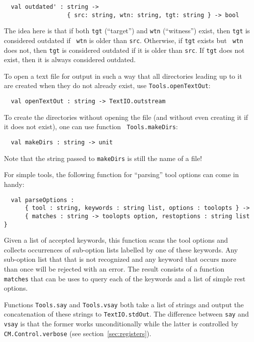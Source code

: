 \begin{verbatim}
  val outdated' : string ->
                  { src: string, wtn: string, tgt: string } -> bool
\end{verbatim}

The idea here is that if both {\tt tgt} (``target'') and {\tt wtn}
(``witness'') exist, then {\tt tgt} is considered outdated if {\tt
wtn} is older than {\tt src}.  Otherwise, if {\tt tgt} exists but {\tt
wtn} does not, then {\tt tgt} is considered outdated if it is older
than {\tt src}.  If {\tt tgt} does not exist, then it is always
considered outdated.

  To open a text file for
output in such a way that all directories leading up to it are created
when they do not already exist, use {\tt Tools.openTextOut}:

\begin{verbatim}
  val openTextOut : string -> TextIO.outstream
\end{verbatim}

To create the directories without opening the file (and without even
creating it if it does not exist), one can use function {\tt
Tools.makeDirs}:

\begin{verbatim}
  val makeDirs : string -> unit
\end{verbatim}

Note that the string passed to {\tt makeDirs} is still the name of a
file!

  For simple tools, the following
function for ``parsing'' tool options can come in handy:

\begin{verbatim}
  val parseOptions :
      { tool : string, keywords : string list, options : toolopts } ->
      { matches : string -> toolopts option, restoptions : string list }
\end{verbatim}

Given a list of accepted keywords, this function scans the tool
options and collects occurrences of sub-option lists labelled by one
of these keywords.  Any sub-option list that that is not recognized
and any keyword that occurs more than once will be rejected with an
error.  The result consists of a function {\tt matches} that can be
uses to query each of the keywords and a list of simple rest options.

  Functions {\tt Tools.say} and
{\tt Tools.vsay} both take a list of strings and output the
concatenation of these strings to {\tt TextIO.stdOut}.  The difference
between {\tt say} and {\tt vsay} is that the former works
unconditionally while the latter is controlled by {\tt
CM.Control.verbose} (see section~\ref{sec:registers}).

